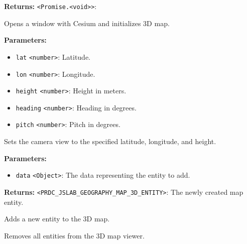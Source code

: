 \documentclass[12pt,a4paper]{article}
\begin{document}
\noindent \textbf{Returns:} \texttt{<Promise.<void>>}: 

\noindent Opens a window with Cesium and initializes 3D map.

\vspace{5mm}
\noindent {}


\noindent \textbf{Parameters:}
\begin{itemize}
  \item \texttt{lat} \texttt{<number>}: Latitude.
  \item \texttt{lon} \texttt{<number>}: Longitude.
  \item \texttt{height} \texttt{<number>}: Height in meters.
  \item \texttt{heading} \texttt{<number>}: Heading in degrees.
  \item \texttt{pitch} \texttt{<number>}: Pitch in degrees.
\end{itemize}

\noindent Sets the camera view to the specified latitude, longitude, and height.

\vspace{5mm}
\noindent {}


\noindent \textbf{Parameters:}
\begin{itemize}
  \item \texttt{data} \texttt{<Object>}: The data representing the entity to add.
\end{itemize}

\noindent \textbf{Returns:} \texttt{<PRDC\_JSLAB\_GEOGRAPHY\_MAP\_3D\_ENTITY>}: The newly created map entity.

\noindent Adds a new entity to the 3D map.

\vspace{5mm}
\noindent {}


\noindent Removes all entities from the 3D map viewer.

\vspace{5mm}
\noindent {}
\end{document}
